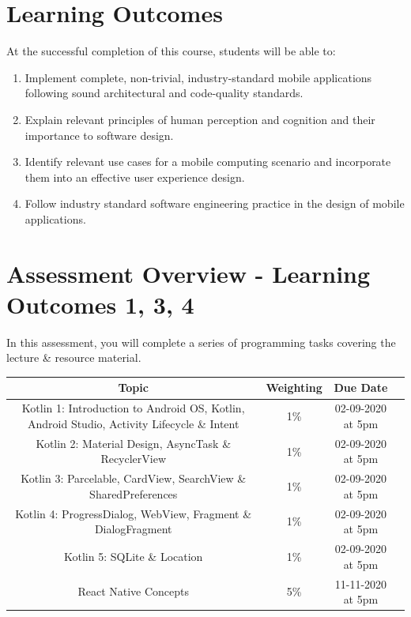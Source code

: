 \documentclass{article}
\begin{document}
\section*{Learning Outcomes}
At the successful completion of this course, students will be able to: 
\begin{enumerate}
	\item Implement complete, non-trivial, industry-standard mobile applications following sound architectural and code-quality standards.
	\item Explain relevant principles of human perception and cognition and their importance to software design.
	\item Identify relevant use cases for a mobile computing scenario and incorporate them into an effective user experience design.
	\item Follow industry standard software engineering practice in the design of mobile applications.
\end{enumerate}

\newpage

\section*{Assessment Overview - Learning Outcomes 1, 3, 4}
In this assessment, you will complete a series of programming tasks covering the lecture \& resource material. \\

\renewcommand{\arraystretch}{1.5}
\begin{tabular}{|c|c|c|c|}
	\hline
	\textbf{Topic}                                                                                    & \textbf{Weighting}  & \textbf{Due Date} \\ \hline 
	\small Kotlin 1: Introduction to Android OS, Kotlin, Android Studio, Activity Lifecycle \& Intent & \small 1\%          & \small 02-09-2020 at 5pm \\ \hline
	\small Kotlin 2: Material Design, AsyncTask \& RecyclerView                                       & \small 1\%          & \small 02-09-2020 at 5pm \\ \hline
	\small Kotlin 3: Parcelable, CardView, SearchView \& SharedPreferences                            & \small 1\%          & \small 02-09-2020 at 5pm \\ \hline
	\small Kotlin 4: ProgressDialog, WebView, Fragment \& DialogFragment                              & \small 1\%          & \small 02-09-2020 at 5pm \\ \hline
	\small Kotlin 5: SQLite \& Location                                                               & \small 1\%          & \small 02-09-2020 at 5pm \\ \hline
	\small React Native Concepts                                  & \small 5\%          & \small 11-11-2020 at 5pm \\ \hline
\end{tabular}
\end{document}
